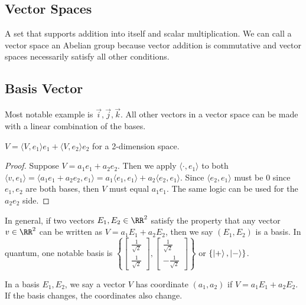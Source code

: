 \documentclass{scrartcl}
\begin{document}
\subsection{Vector Spaces}
A set that supports addition into itself and scalar multiplication. We can call a vector space an 
Abelian group because vector addition is commutative and vector spaces necessarily satisfy all other 
conditions.

\subsection{Basis Vector}
Most notable example is $\vec i, \vec j, \vec k$. All other vectors in a vector space can be made with a 
linear combination of the bases.
\begin{lemma}
	$V = \langle V, e_1 \rangle e_1 + \langle V, e_2 \rangle e_2$ for a 2-dimension space. 
\end{lemma}
\begin{proof}
	Suppose $V = a_1 e_1 + a_2 e_2$. Then we apply $\langle \cdot, e_1 \rangle$ to both 
	$\langle v, e_1 \rangle = \langle a_1e_1 + a_2e_2, e_1 \rangle = a_1 \langle e_1, e_1 \rangle + a_2
	\langle e_2, e_1 \rangle$. Since $\langle e_2, e_1 \rangle$ must be $0$ since $e_1, e_2$ are both
	bases, then $V$ must equal $a_1 e_1$. The same logic can be used for the $a_2 e_2$ side. 
\end{proof}

In general, if two vectors $E_1, E_2 \in \RR^2$ satisfy the property that any vector $v \in \RR^2$ can be 
written as $V = a_1E_1 + a_2E_2$, then we say $(E_1, E_2)$ is a basis. In quantum, one notable basis is $\left \{ \begin{bmatrix}
 \frac{1}{\sqrt 2} \\ \frac{1}{\sqrt 2} \end{bmatrix}, 
\begin{bmatrix} \frac{1}{\sqrt 2} \\ -\frac{1}{\sqrt 2} \end{bmatrix} \right \}$ or $\{ \ket +, \ket - \}$.

In a basis $E_1, E_2$, we say a vector $V$ has coordinate $(a_1, a_2)$ if $V = a_1E_1 + a_2E_2$. If the basis changes, the
 coordinates also change.
\end{document}
